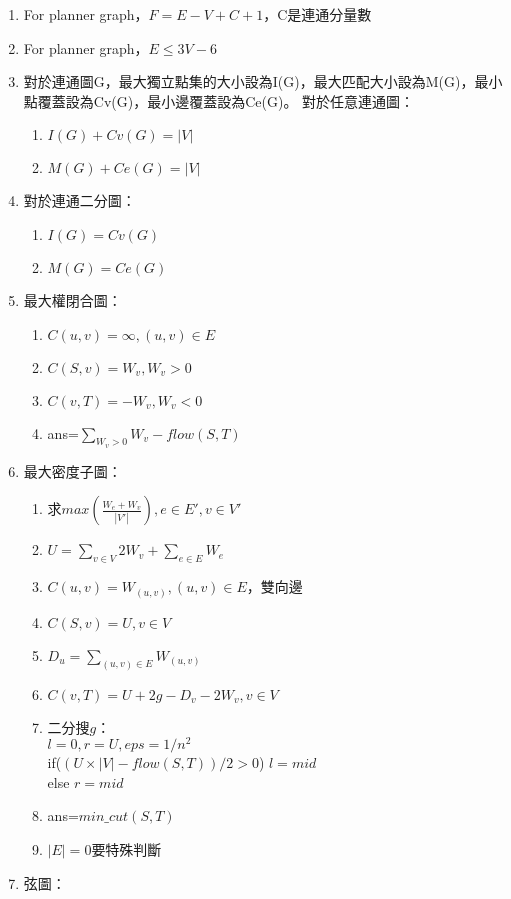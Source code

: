 \begin{enumerate}\itemsep = -5pt
\item For planner graph，$F=E-V+C+1$，C是連通分量數
\item For planner graph，$E\leq 3V-6$
\item 對於連通圖G，最大獨立點集的大小設為I(G)，最大匹配大小設為M(G)，最小點覆蓋設為Cv(G)，最小邊覆蓋設為Ce(G)。
對於任意連通圖：
	\begin{enumerate}\itemsep = -3pt
	\item $I(G)+Cv(G)=|V|$
	\item $M(G)+Ce(G)=|V|$
	\end{enumerate}
\item 對於連通二分圖：
	\begin{enumerate}\itemsep = -3pt
	\item $I(G)=Cv(G)$
	\item $M(G)=Ce(G)$
	\end{enumerate}
\item 最大權閉合圖：
	\begin{enumerate}\itemsep = -3pt
	\item $C(u,v)=\infty ,(u,v)\in E$
	\item $C(S,v)=W_v ,W_v>0$
	\item $C(v,T)=-W_v ,W_v<0$
	\item ans=$\sum_{W_v>0} W_v-flow(S,T)$
	\end{enumerate}
\item 最大密度子圖：
	\begin{enumerate}\itemsep = -1pt
	\item 求$max\left(\frac{W_e+W_v}{|V'|}\right),e \in E',v \in V'$
	\item $U=\sum_{v \in V}2W_v+\sum_{e \in E} W_e$
	\item $C(u,v)=W_{(u,v)} ,(u,v)\in E$，雙向邊
	\item $C(S,v)=U ,v \in V$
	\item $D_u=\sum_{(u,v) \in E} W_{(u,v)}$
	\item $C(v,T)=U+2g-D_v-2W_v ,v \in V$
	\item 二分搜$g$：\\$l=0,r=U,eps=1/n^2$\\if($(U\times|V|-flow(S,T))/2>0$) $l=mid$\\else $r=mid$
	\item ans=$min\_cut(S,T)$
	\item $|E|=0$要特殊判斷
	\end{enumerate}
\item 弦圖：

\end{enumerate}
